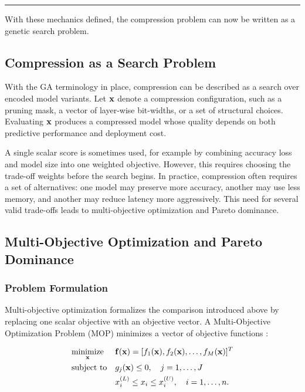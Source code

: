 \vspace{0.4em}
\noindent\rule{0.35\textwidth}{0.4pt}
\vspace{0.4em}

With these mechanics defined, the compression problem can now be written as a genetic search problem.

\subsection{Compression as a Search Problem}

With the GA terminology in place, compression can be described as a search over encoded model variants. Let $\mathbf{x}$ denote a compression configuration, such as a pruning mask, a vector of layer-wise bit-widths, or a set of structural choices. Evaluating $\mathbf{x}$ produces a compressed model whose quality depends on both predictive performance and deployment cost.

A single scalar score is sometimes used, for example by combining accuracy loss and model size into one weighted objective. However, this requires choosing the trade-off weights before the search begins. In practice, compression often requires a set of alternatives: one model may preserve more accuracy, another may use less memory, and another may reduce latency more aggressively. This need for several valid trade-offs leads to multi-objective optimization and Pareto dominance.

\subsection{Multi-Objective Optimization and Pareto Dominance}

\subsubsection{Problem Formulation}
Multi-objective optimization formalizes the comparison introduced above by replacing one scalar objective with an objective vector. A Multi-Objective Optimization Problem (MOP) minimizes a vector of objective functions \cite{deb2001multi}:

\begin{equation}
	\begin{aligned}
		& \underset{\mathbf{x}}{\text{minimize}}
		& & \mathbf{f}(\mathbf{x}) = [f_1(\mathbf{x}), f_2(\mathbf{x}), \dots, f_M(\mathbf{x})]^T \\
		& \text{subject to}
		& & g_j(\mathbf{x}) \leq 0, \quad j = 1, \dots, J \\
		& & & x_i^{(L)} \leq x_i \leq x_i^{(U)}, \quad i = 1, \dots, n .
	\end{aligned}
\end{equation}

